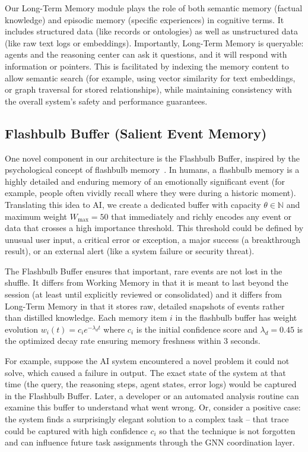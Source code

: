 \documentclass{article}
\begin{document}
Our Long-Term Memory module plays the role of both semantic memory (factual knowledge) and episodic memory (specific experiences) in cognitive terms. It includes structured data (like records or ontologies) as well as unstructured data (like raw text logs or embeddings). Importantly, Long-Term Memory is queryable: agents and the reasoning center can ask it questions, and it will respond with information or pointers. This is facilitated by indexing the memory content to allow semantic search (for example, using vector similarity for text embeddings, or graph traversal for stored relationships), while maintaining consistency with the overall system's safety and performance guarantees.

\subsection{Flashbulb Buffer (Salient Event Memory)}

One novel component in our architecture is the Flashbulb Buffer, inspired by the psychological concept of flashbulb memory~\cite{brown1977flashbulb}. In humans, a flashbulb memory is a highly detailed and enduring memory of an emotionally significant event (for example, people often vividly recall where they were during a historic moment). Translating this idea to AI, we create a dedicated buffer with capacity $\theta \in \mathbb{N}$ and maximum weight $W_{\max} = 50$ that immediately and richly encodes any event or data that crosses a high importance threshold. This threshold could be defined by unusual user input, a critical error or exception, a major success (a breakthrough result), or an external alert (like a system failure or security threat).

The Flashbulb Buffer ensures that important, rare events are not lost in the shuffle. It differs from Working Memory in that it is meant to last beyond the session (at least until explicitly reviewed or consolidated) and it differs from Long-Term Memory in that it stores raw, detailed snapshots of events rather than distilled knowledge. Each memory item $i$ in the flashbulb buffer has weight evolution $w_i(t) = c_i e^{-\lambda_d t}$ where $c_i$ is the initial confidence score and $\lambda_d = 0.45$ is the optimized decay rate ensuring memory freshness within 3 seconds.

For example, suppose the AI system encountered a novel problem it could not solve, which caused a failure in output. The exact state of the system at that time (the query, the reasoning steps, agent states, error logs) would be captured in the Flashbulb Buffer. Later, a developer or an automated analysis routine can examine this buffer to understand what went wrong. Or, consider a positive case: the system finds a surprisingly elegant solution to a complex task – that trace could be captured with high confidence $c_i$ so that the technique is not forgotten and can influence future task assignments through the GNN coordination layer.
\end{document}
